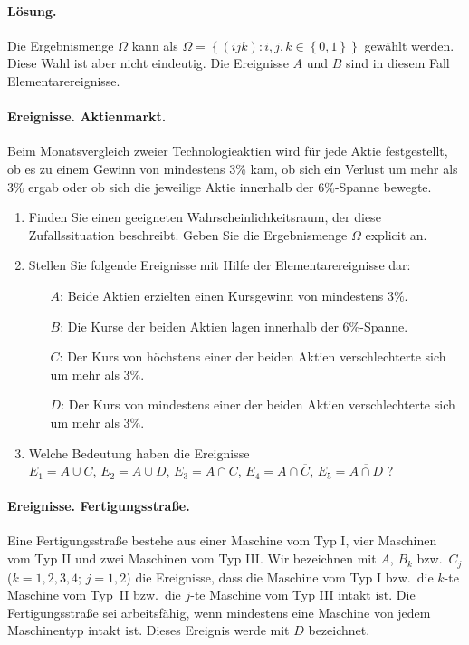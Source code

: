 \paragraph*{Lösung.} Die Ergebnismenge $\Omega$ kann als $\Omega= \left\{ (ijk)
: i,j,k\in \left\{ 0,1 \right\} \right\}$ gewählt werden. Diese Wahl ist aber nicht 
eindeutig. Die Ereignisse $A$ und $B$ sind in diesem Fall Elementarereignisse. 


\paragraph{Ereignisse. Aktienmarkt.}
Beim Monatsvergleich zweier Technologieaktien wird für jede Aktie
festgestellt, ob es zu einem Gewinn von mindestens 3\% kam, ob sich ein Verlust
um mehr als 3\% ergab oder ob sich die jeweilige Aktie innerhalb der 6\%-Spanne
bewegte.
\begin{enumerate}
    \item Finden Sie einen geeigneten Wahrscheinlichkeitsraum, der diese
        Zufallssituation beschreibt. Geben Sie die Ergebnismenge $\Omega$
        explicit an.
    \item Stellen Sie folgende Ereignisse mit Hilfe der Elementarereignisse
        dar:
        \begin{itemize}
            \item[$A$:] Beide Aktien erzielten einen Kursgewinn von mindestens $3\%$.
            \item[$B$:] Die Kurse der beiden Aktien lagen innerhalb der
                $6\%$-Spanne. %
            \item[$C$:] Der Kurs von höchstens einer der beiden Aktien
                verschlechterte sich um mehr als $3\%$. 
            \item[$D$:] Der Kurs von mindestens einer der beiden Aktien
                verschlechterte sich um mehr als $3\%$. 
        \end{itemize}
    \item Welche Bedeutung haben die Ereignisse\\
        $E_1=A\cup C$, $E_2=A\cup D$,
        $E_3=A\cap C$, $E_4=A\cap\overline{C}$, $E_5= \overline{A\cap D}$ ?
\end{enumerate}



\paragraph{Ereignisse. Fertigungsstraße.}
Eine Fertigungsstraße bestehe  aus einer Maschine vom Typ I, vier Maschinen vom
Typ II und zwei Maschinen vom Typ III. Wir bezeichnen mit $A$, $B_k$ bzw.\
$C_j$ ($k=1,2,3,4$; $j=1,2$) die Ereignisse, dass die Maschine vom Typ I
bzw.~die $k$-te Maschine vom Typ~II bzw.~die $j$-te Maschine vom Typ III intakt
ist. Die Fertigungsstraße sei arbeitsfähig, wenn mindestens eine Maschine von
jedem Maschinentyp intakt ist. Dieses Ereignis werde mit $D$ bezeichnet.

